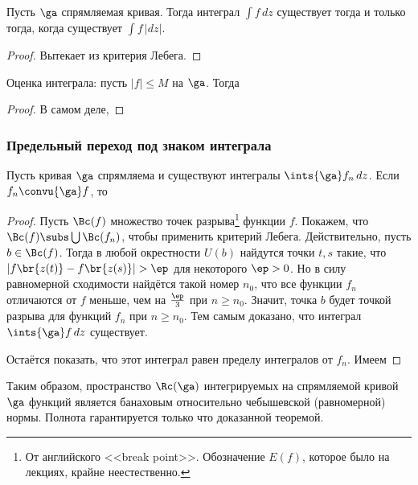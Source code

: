 \documentclass[a4paper]{article}
\begin{document}
\begin{solution}
\begin{stm}
Пусть $\ga$ спрямляемая кривая. Тогда интеграл $\int f\,dz$ существует тогда и только тогда, когда существует
$\int f\,|dz|$.
\end{stm}
\begin{proof}
Вытекает из критерия Лебега.
\end{proof}

\begin{stm}
Оценка интеграла: пусть $|f| \le M$ на $\ga$. Тогда
\end{stm}
\begin{proof}
В самом деле,
\hfill\end{proof}

\subsubsection{Предельный переход под знаком интеграла}

\begin{theorem}
Пусть кривая $\ga$ спрямляема и существуют интегралы $\ints{\ga}f_n\,dz$.
Если $f_n \convu{\ga} f$, то
\end{theorem}
\begin{proof}
Пусть $\Bc(f)$ множество точек разрыва\footnote{От английского <<break point>>.
Обозначение $E(f)$, которое было на лекциях, крайне неестественно.}
функции $f$. Покажем, что $\Bc(f) \subs \bigcup \Bc(f_n)$, чтобы применить критерий Лебега.
Действительно, пусть $b\in \Bc(f)$.
Тогда в любой окрестности $U(b)$ найдутся точки $t,s$ такие, что $|f\br{z(t)}-f\br{z(s)}|>\ep$ для
некоторого $\ep > 0$. Но в силу равномерной сходимости найдётся такой номер $n_0$, что все функции $f_n$
отличаются от $f$ меньше, чем на $\frac{\ep}{3}$ при $n\ge n_0$. Значит, точка $b$ будет точкой разрыва
для функций $f_n$ при $n\ge n_0$. Тем самым доказано, что интеграл $\ints{\ga}f\,dz$ существует.

Остаётся показать, что этот интеграл равен пределу интегралов от $f_n$.
Имеем
\hfill\end{proof}

Таким образом, пространство $\Rc(\ga)$ интегрируемых на спрямляемой кривой $\ga$ функций является банаховым относительно
чебышевской (равномерной) нормы. Полнота гарантируется только что доказанной теоремой.


\end{solution}
\end{document}
